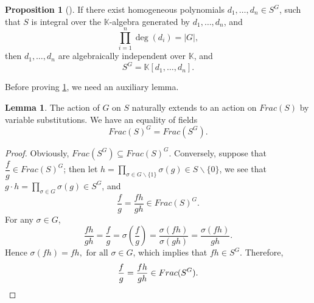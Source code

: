 \documentclass[12pt,a4paper]{report}
\theoremstyle{definition}
\newtheorem{proposition}[theorem]{Proposition}
\newtheorem{lemma}[theorem]{Lemma}
\theoremstyle{remark}
\theoremstyle{definition}
\begin{document}
\begin{proposition}[{\cite[Proposition 4.5.5]{neusel_invariant_2002}}]\label{prop:prod_of_deg_equals_G_implies_polynomial}
If there exist homogeneous polynomials $d_1, \ldots, d_n\in S^G$, such that $S$ is integral over the $\mathbb{K}$-algebra generated by $d_1, \ldots, d_n$, and 
\begin{equation*}
 \prod\limits_{i=1}^n \deg(d_i) = |G|,   
\end{equation*}
then $d_1, \ldots, d_n$ are algebraically independent over $\mathbb{K}$, and
\begin{equation*}
    S^G = \mathbb{K}[d_1, \ldots, d_n].
\end{equation*}
\end{proposition}
Before proving \cref{prop:prod_of_deg_equals_G_implies_polynomial}, we need an auxiliary lemma.
\begin{lemma}\label{lemma:integrality_and_fraction_field}
    The action of $G$ on $S$ naturally extends to an action on $Frac(S)$ by variable substitutions. We have an equality of fields
    \begin{equation*}
        Frac(S)^G = Frac(S^G).
    \end{equation*}
\end{lemma}
\begin{proof}
    Obviously, $Frac(S^G)\subseteq Frac(S)^G$. Conversely, suppose that $\dfrac{f}{g}\in Frac(S)^G$; then let $h=\prod\limits_{\sigma\in G\backslash\{1\}}\sigma(g)\in S\backslash\{0\}$, we see that $g\cdot h = \prod\limits_{\sigma\in G}\sigma(g) \in S^G$, and
    \begin{equation*}
        \dfrac{f}{g} = \dfrac{fh}{gh}\in Frac(S)^G.
    \end{equation*}
    For any $\sigma\in G$, 
    \begin{equation*}
        \dfrac{fh}{gh}=\dfrac{f}{g} =\sigma\left(\dfrac{f}{g}\right)= \dfrac{\sigma(fh)}{\sigma(gh)}= \dfrac{\sigma(fh)}{gh}.
    \end{equation*}
    Hence $\sigma(fh) = fh,\text{ for all } \sigma\in G$, which implies that $fh\in S^G$. Therefore, 
    \begin{equation*}
        \dfrac{f}{g}=\dfrac{fh}{gh}\in Frac(S^G).\qedhere
    \end{equation*}
\end{proof}
\end{document}
